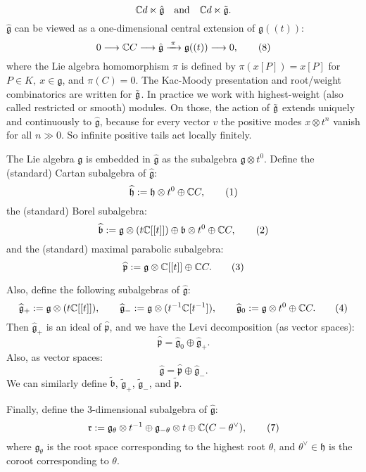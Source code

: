 \documentclass[12pt]{article}
\begin{document}
\[
    \mathbb{C} d \ltimes \hat{\mathfrak g}
    \quad\text{and}\quad
    \mathbb{C} d \ltimes \tilde{\mathfrak g}.
\]
$\hat{\mathfrak g}$ can be viewed as a one-dimensional central extension of $\mathfrak g((t))$:
\begin{equation}
    0 \longrightarrow \mathbb{C} C
    \longrightarrow \hat{\mathfrak g}
    \xrightarrow{\;\pi\;}
    \mathfrak g((t))
    \longrightarrow 0,
    \tag{8}
\end{equation}
where the Lie algebra homomorphism $\pi$ is defined by $\pi(x[P]) = x[P]$ for $P\in K,\ x\in\mathfrak g$, and $\pi(C)=0$.
The Kac-Moody presentation and root/weight combinatorics are written for $\tilde{\mathfrak{g}}$. In practice we work with highest-weight (also called restricted or smooth) modules. On those, the action of $\tilde{\mathfrak{g}}$ extends uniquely and continuously to $\widehat{\mathfrak g}$, because for every vector $v$ the positive modes $x\otimes t^{n}$ vanish for all $n\gg0$. So infinite positive tails act locally finitely.

\begin{definition}
    The Lie algebra $\mathfrak g$ is embedded in
    $\widehat{\mathfrak g}$ as the subalgebra $\mathfrak g\otimes t^0$.
    Define the (standard) Cartan subalgebra of $\widehat{\mathfrak g}$:
    \[
        \widehat{\mathfrak h} := \mathfrak h\otimes t^0 \oplus \mathbb{C} C,
        \tag{1}
    \]
    the (standard) Borel subalgebra:
    \[
        \widehat{\mathfrak b} := \mathfrak g\otimes (t\mathbb{C}[[t]]) \oplus \mathfrak b\otimes t^0 \oplus \mathbb{C} C,
        \tag{2}
    \]
    and the (standard) maximal parabolic subalgebra:
    \[
        \widehat{\mathfrak p} := \mathfrak g\otimes \mathbb{C}[[t]] \oplus \mathbb{C} C.
        \tag{3}
    \]

    Also, define the following subalgebras of $\widehat{\mathfrak g}$:
    \[
        \widehat{\mathfrak g}_+ := \mathfrak g\otimes (t\mathbb{C}[[t]]), \qquad
        \widehat{\mathfrak g}_- := \mathfrak g\otimes (t^{-1}\mathbb{C}[t^{-1}]), \qquad
        \widehat{\mathfrak g}_0 := \mathfrak g\otimes t^0 \oplus \mathbb{C} C.
        \tag{4}
    \]
    Then $\widehat{\mathfrak g}_+$ is an ideal of $\widehat{\mathfrak p}$,
    and we have the Levi decomposition (as vector spaces):
    \[
        \widehat{\mathfrak p}
        = \widehat{\mathfrak g}_0 \oplus \widehat{\mathfrak g}_+.
        \tag{5}
    \]
    Also, as vector spaces:
    \[
        \widehat{\mathfrak g} = \widehat{\mathfrak p} \oplus \widehat{\mathfrak g}_-.
        \tag{6}
    \]
    We can similarly define $\widetilde{\mathfrak b}$,
    $\widetilde{\mathfrak g}_+$,
    $\widetilde{\mathfrak g}_-$, and
    $\widetilde{\mathfrak p}$.

    Finally, define the $3$-dimensional subalgebra of $\widehat{\mathfrak g}$:
    \[
        \mathfrak r :=
        \mathfrak g_\theta\otimes t^{-1}
        \oplus \mathfrak g_{-\theta}\otimes t
        \oplus \mathbb{C}(C-\theta^\vee),
        \tag{7}
    \]
    where $\mathfrak g_\theta$ is the root space corresponding to the highest
    root $\theta$, and $\theta^\vee\in\mathfrak h$ is the coroot corresponding
    to $\theta$.
\end{definition}
\end{document}
